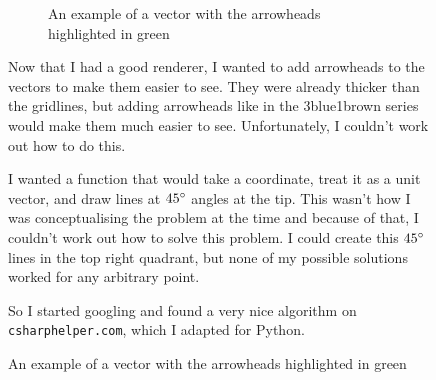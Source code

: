 \documentclass[../main.tex]{subfiles}
\begin{document}
\begin{figure}[H]
	\hspace{0.005\linewidth}
	\centering
	\begin{minipage}{0.40\linewidth}
		\centering
		\begin{figure}[H]
			\centering
			\caption{An example of a vector with the arrowheads highlighted in green}
			\label{tikz:development:improving-the-gui:adding-vector-arrowheads}
		\end{figure}
	\end{minipage}%
	\hspace{0.015\linewidth}
	\begin{minipage}{0.56\linewidth}\setspacing
		Now that I had a good renderer, I wanted to add arrowheads to the vectors to make them easier to see. They were already thicker than the gridlines, but adding arrowheads like in the 3blue1brown series would make them much easier to see. Unfortunately, I couldn't work out how to do this.

		I wanted a function that would take a coordinate, treat it as a unit vector, and draw lines at $45\degree$ angles at the tip. This wasn't how I was conceptualising the problem at the time and because of that, I couldn't work out how to solve this problem. I could create this $45\degree$ lines in the top right quadrant, but none of my possible solutions worked for any arbitrary point.

		So I started googling and found a very nice algorithm on \texttt{csharphelper.com}\cite{csharphelper-arrowheads}\footnotemark, which I adapted for Python.
	\end{minipage}
	\hspace{0.005\linewidth}
	\vspace{-1em}
\end{figure}

\end{document}

